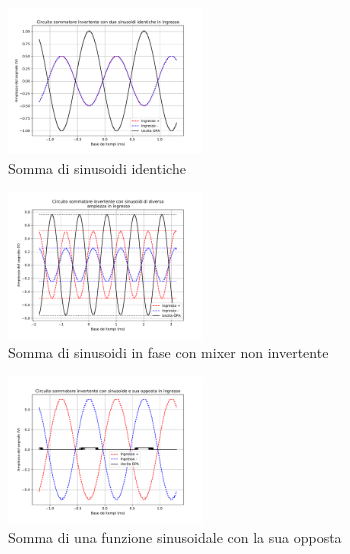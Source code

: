 \documentclass[journal]{IEEEtran}
\begin{document}
\begin{figure}[H]%
\begin {center}
\includegraphics[width=0.46\textwidth]{analysis/output/OPA_mixer_sin0.pdf}
\caption{Somma di sinusoidi identiche}
\label{fig:Mixer1}
\end {center}
\end{figure}

\begin{figure}[H]%
\begin {center}
\includegraphics[width=0.46\textwidth]{analysis/output/OPA_mixer_sin3.pdf}
\caption{Somma di sinusoidi in fase con mixer non invertente}
\label{fig:Mixer3}
\end {center}
\end{figure}

\begin{figure}[H]%
\begin {center}
\includegraphics[width=0.46\textwidth]{analysis/output/OPA_mixer_sin2.pdf}
\caption{Somma di una funzione sinusoidale con la sua opposta}
\label{fig:Mixer2}
\end {center}
\end{figure}
\end{document}
